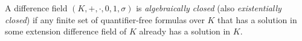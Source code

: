 A difference field $(K, +, \cdot, 0, 1, \sigma)$ is \textit{algebraically closed} (also \textit{existentially closed}) if any finite set of quantifier-free formulas over $K$ that has a solution in some extension difference field of $K$ already has a solution in $K$.
